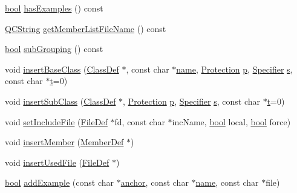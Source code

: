 \begin{DoxyCompactItemize}
\item 
\hyperlink{qglobal_8h_a1062901a7428fdd9c7f180f5e01ea056}{bool} \hyperlink{class_class_def_ab5aeabb307e565ce7c425647a90b73a1}{has\+Examples} () const 
\item 
\hyperlink{class_q_c_string}{Q\+C\+String} \hyperlink{class_class_def_ac3129c1f468072412b4f87af6e3271cd}{get\+Member\+List\+File\+Name} () const 
\item 
\hyperlink{qglobal_8h_a1062901a7428fdd9c7f180f5e01ea056}{bool} \hyperlink{class_class_def_ada51e5a9dba70ca9c59bac1c13f52b3a}{sub\+Grouping} () const 
\item 
void \hyperlink{class_class_def_af56668052b901e946126758e85b75a2a}{insert\+Base\+Class} (\hyperlink{class_class_def}{Class\+Def} $\ast$, const char $\ast$\hyperlink{class_definition_a99481361779e85f0c1556709de7d9e5b}{name}, \hyperlink{types_8h_a90e352184df58cd09455fe9996cd4ded}{Protection} \hyperlink{060__command__switch_8tcl_a15229b450f26d8fa1c10bea4f3279f4d}{p}, \hyperlink{types_8h_ab16236bdd10ddf4d73a9847350f0017e}{Specifier} \hyperlink{060__command__switch_8tcl_a011c73f2dbb87635a3b4206c72355f6e}{s}, const char $\ast$\hyperlink{058__bracket__recursion_8tcl_a69e959f6901827e4d8271aeaa5fba0fc}{t}=0)
\item 
void \hyperlink{class_class_def_a842c8a6c817b87f412a50ca58fc1142d}{insert\+Sub\+Class} (\hyperlink{class_class_def}{Class\+Def} $\ast$, \hyperlink{types_8h_a90e352184df58cd09455fe9996cd4ded}{Protection} \hyperlink{060__command__switch_8tcl_a15229b450f26d8fa1c10bea4f3279f4d}{p}, \hyperlink{types_8h_ab16236bdd10ddf4d73a9847350f0017e}{Specifier} \hyperlink{060__command__switch_8tcl_a011c73f2dbb87635a3b4206c72355f6e}{s}, const char $\ast$\hyperlink{058__bracket__recursion_8tcl_a69e959f6901827e4d8271aeaa5fba0fc}{t}=0)
\item 
void \hyperlink{class_class_def_a54f3cf488b1e3dbb722197c22c9ca6b8}{set\+Include\+File} (\hyperlink{class_file_def}{File\+Def} $\ast$fd, const char $\ast$inc\+Name, \hyperlink{qglobal_8h_a1062901a7428fdd9c7f180f5e01ea056}{bool} local, \hyperlink{qglobal_8h_a1062901a7428fdd9c7f180f5e01ea056}{bool} force)
\item 
void \hyperlink{class_class_def_a47e87d243d882ef9e05e68259b5e0254}{insert\+Member} (\hyperlink{class_member_def}{Member\+Def} $\ast$)
\item 
void \hyperlink{class_class_def_a87fd3b5ee9194f25f1d6aaf8359c8b54}{insert\+Used\+File} (\hyperlink{class_file_def}{File\+Def} $\ast$)
\item 
\hyperlink{qglobal_8h_a1062901a7428fdd9c7f180f5e01ea056}{bool} \hyperlink{class_class_def_a009ccc7e1085a853c2a677cbb1d29b05}{add\+Example} (const char $\ast$\hyperlink{class_class_def_a28f29dbbc5c2646bc64bae479fd7b905}{anchor}, const char $\ast$\hyperlink{class_definition_a99481361779e85f0c1556709de7d9e5b}{name}, const char $\ast$file)

\end{DoxyCompactItemize}
